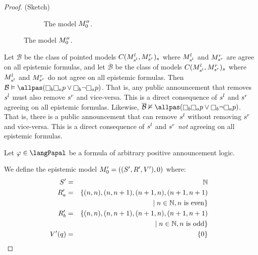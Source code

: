 \begin{proof}{(Sketch)}
\begin{figure}
\begin{subfigure}[t]{\linewidth}
            \caption{The model $\kPModel[\prime\prime]{0}$.}\label{expressivity-s5-3}
        \end{subfigure}
    \end{figure}

    Let $\mathcal{B}$ be the class of pointed models $C(\kPModel[l]{\kStateS[l]},\kPModel[r]{\kStateS[r]})_{\kStateS}$ where $\kPModel[l]{\kStateS[l]}$ and $\kPModel[r]{\kStateS[r]}$ are agree on all epistemic formulas, and let $\overline{\mathcal{B}}$ be the class of models $C(\kPModel[l]{\kStateS[l]},\kPModel[r]{\kStateS[r]})_{\kStateS}$ where $\kPModel[l]{\kStateS[l]}$ and $\kPModel[r]{\kStateS[r]}$ do not agree on all epistemic formulas. 
    Then $\mathcal{B} \entails \allpas(\knows[\agentB] \knows[\agentA] \atomP \lor \knows[\agentB] \neg \knows[\agentA] \atomP)$.
    That is, any public announcement that removes $\kStateS[l]$ must also remove $\kStateS[r]$ and vice-versa. 
    This is a direct consequence of $\kStateS[l]$ and $\kStateS[r]$ agreeing on all epistemic formulas.
    Likewise, $\overline{\mathcal{B}} \nentails \allpas(\knows[\agentB] \knows[\agentA] \atomP \lor \knows[\agentB] \neg \knows[\agentA] \atomP)$.
    That is, there is a public announcement that can remove $\kStateS[l]$ without removing $\kStateS[r]$ and vice-versa.
    This is a direct consequence of $\kStateS[l]$ and $\kStateS[r]$ {\em not} agreeing on all epistemic formulas.

    Let $\phi \in \langPapal$ be a formula of arbitrary positive announcement logic.

    We define the epistemic model $\kPModelAndTuple[\prime]{0}$ where:
    \begin{eqnarray*}
        \kStates[\prime] &=& \naturals\\
        \kAccessibility[\prime]{\agentA} &=& \{(n, n), (n, n + 1), (n + 1, n), (n + 1, n + 1) \\&&\quad \mid n \in \naturals, n \text{ is even}\}\\
        \kAccessibility[\prime]{\agentB} &=& \{(n, n), (n, n + 1), (n + 1, n), (n + 1, n + 1) \\&&\quad \mid n \in \naturals, n \text{ is odd}\}\\
        \kValuation[\prime](\atomQ) &=& \{0\}
    \end{eqnarray*}


\end{proof}
